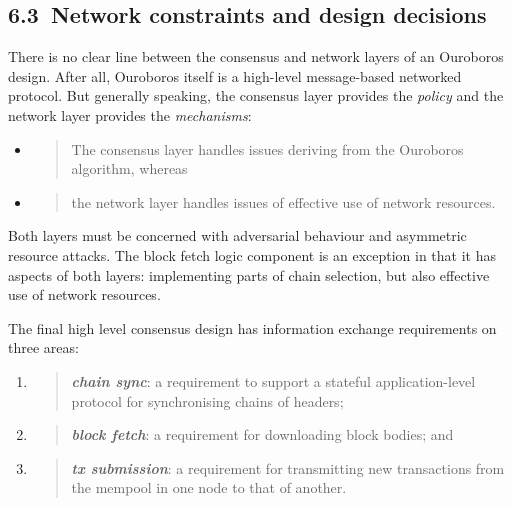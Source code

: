 \documentclass[]{article}
\begin{document}
\hypertarget{network-constraints-and-design-decisions}{%
\subsection{​6.3​~Network constraints and design
decisions}\label{network-constraints-and-design-decisions}}

There is no clear line between the consensus and network layers of an
Ouroboros design. After all, Ouroboros itself is a high-level
message-based networked protocol. But generally speaking, the consensus
layer provides the \emph{policy} and the network layer provides the
\emph{mechanisms}:

\begin{itemize}
\item
  \begin{quote}
  The consensus layer handles issues deriving from the Ouroboros
  algorithm, whereas
  \end{quote}
\item
  \begin{quote}
  the network layer handles issues of effective use of network
  resources.
  \end{quote}
\end{itemize}

Both layers must be concerned with adversarial behaviour and asymmetric
resource attacks. The block fetch logic component is an exception in
that it has aspects of both layers: implementing parts of chain
selection, but also effective use of network resources.

The final high level consensus design has information exchange
requirements on three areas:

\begin{enumerate}
\def\labelenumi{\arabic{enumi}.}
\item
  \begin{quote}
  \emph{\textbf{chain sync}}: a requirement to support a stateful
  application-level protocol for synchronising chains of headers;
  \end{quote}
\item
  \begin{quote}
  \emph{\textbf{block fetch}}: a requirement for downloading block
  bodies; and
  \end{quote}
\item
  \begin{quote}
  \emph{\textbf{tx submission}}: a requirement for transmitting new
  transactions from the mempool in one node to that of another.
  \end{quote}
\end{enumerate}
\end{document}
